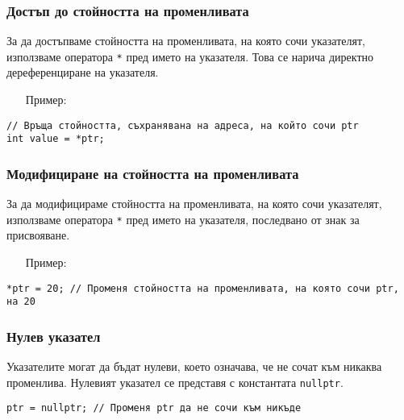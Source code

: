 \documentclass[oneside]{book}
\newcommand*{\code}[1]{\texttt{#1}}
\begin{document}
\subsubsection{Достъп до стойността на променливата}
За да достъпваме стойността на променливата, на която сочи указателят, използваме оператора \code{*} пред името на указателя.
Това се нарича директно дереференциране на указателя.

\begin{itemize}\item[Пример:]\end{itemize}
\begin{mdframed}\begin{lstlisting}
// Връща стойността, съхранявана на адреса, на който сочи ptr
int value = *ptr;
\end{lstlisting}\end{mdframed}

\subsubsection{Модифициране на стойността на променливата}
За да модифицираме стойността на променливата, на която сочи указателят, използваме оператора \code{*} пред името на указателя, последвано от знак за присвояване.
\pagebreak
\begin{itemize}\item[Пример:]\end{itemize}
\begin{mdframed}\begin{lstlisting}
*ptr = 20; // Променя стойността на променливата, на която сочи ptr, на 20
\end{lstlisting}\end{mdframed}

\subsubsection{Нулев указател}
Указателите могат да бъдат нулеви, което означава, че не сочат към никаква променлива. Нулевият указател се представя с константата \code{nullptr}.

\begin{mdframed}\begin{lstlisting}
ptr = nullptr; // Променя ptr да не сочи към никъде
\end{lstlisting}\end{mdframed}
\end{document}
